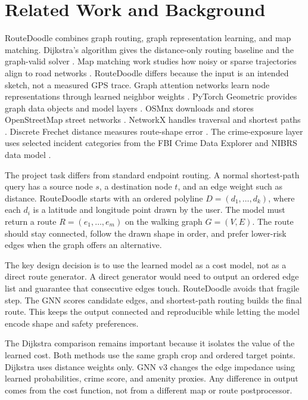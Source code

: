 \documentclass{article}
\begin{document}
\section{Related Work and Background}

RouteDoodle combines graph routing, graph representation learning, and map matching. Dijkstra's algorithm gives the distance-only routing baseline and the graph-valid solver \citep{dijkstra1959note}. Map matching work studies how noisy or sparse trajectories align to road networks \citep{newson2009hidden}. RouteDoodle differs because the input is an intended sketch, not a measured GPS trace. Graph attention networks learn node representations through learned neighbor weights \citep{velickovic2018graph}. PyTorch Geometric provides graph data objects and model layers \citep{fey2019fast}. OSMnx downloads and stores OpenStreetMap street networks \citep{boeing2017osmnx,openstreetmap}. NetworkX handles traversal and shortest paths \citep{hagberg2008exploring}. Discrete Frechet distance measures route-shape error \citep{eiter1994computing}. The crime-exposure layer uses selected incident categories from the FBI Crime Data Explorer and NIBRS data model \citep{fbi_nibrs}.

The project task differs from standard endpoint routing. A normal shortest-path query has a source node \(s\), a destination node \(t\), and an edge weight such as distance. RouteDoodle starts with an ordered polyline \(D=(d_1,\ldots,d_k)\), where each \(d_i\) is a latitude and longitude point drawn by the user. The model must return a route \(R=(e_1,\ldots,e_m)\) on the walking graph \(G=(V,E)\). The route should stay connected, follow the drawn shape in order, and prefer lower-risk edges when the graph offers an alternative.

The key design decision is to use the learned model as a cost model, not as a direct route generator. A direct generator would need to output an ordered edge list and guarantee that consecutive edges touch. RouteDoodle avoids that fragile step. The GNN scores candidate edges, and shortest-path routing builds the final route. This keeps the output connected and reproducible while letting the model encode shape and safety preferences.

The Dijkstra comparison remains important because it isolates the value of the learned cost. Both methods use the same graph crop and ordered target points. Dijkstra uses distance weights only. GNN v3 changes the edge impedance using learned probabilities, crime score, and amenity proxies. Any difference in output comes from the cost function, not from a different map or route postprocessor.
\end{document}
